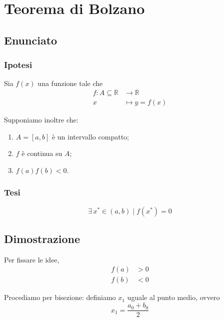 \documentclass[../../analisi1]{subfiles}
\begin{document}
    \chapter{Teorema di Bolzano}
    \label{teoBolzano}

        \section*{Enunciato}

            \subsection*{Ipotesi}

                Sia \(f(x)\) una funzione tale che
                \begin{align*}
                    f : A \subseteq \mathbb{R} &\longrightarrow \mathbb{R}\\
                    x &\longmapsto y = f(x) 
                \end{align*}

                Supponiamo inoltre che:

                \begin{enumerate}
                    \indentitem \item \(A = [a, b]\) è un intervallo compatto;
                    \indentitem \item \(f\) è continua su \(A\);
                    \indentitem \item \(f(a) f(b) < 0\).
                \end{enumerate}

            \subsection*{Tesi}
            
                \[\exists \, x^* \in (a,b) \; | \; f(x^*) = 0 \]

        \section*{Dimostrazione}

            Per fissare le idee,
            \begin{align*}
                f(a) &> 0\\
                f(b) &< 0
            \end{align*}

            Procediamo per bisezione: definiamo \(x_1\) uguale al punto medio, ovvero
            \[
                x_1 = \frac{a_0 + b_0}{2}
            \]
\end{document}
